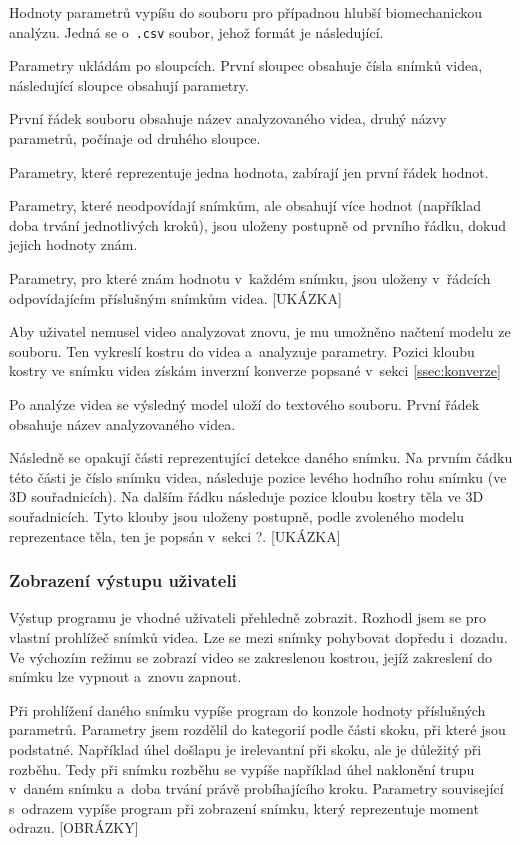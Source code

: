 Hodnoty parametrů vypíšu do souboru pro případnou hlubší biomechanickou analýzu. Jedná se o~\texttt{.csv} soubor, jehož formát je následující.

Parametry ukládám po sloupcích. První sloupec obsahuje čísla snímků videa, následující sloupce obsahují parametry.

První řádek souboru obsahuje název analyzovaného videa, druhý názvy parametrů, počínaje od druhého sloupce.

Parametry, které reprezentuje jedna hodnota, zabírají jen první řádek hodnot.

Parametry, které neodpovídají snímkům, ale obsahují více hodnot (například doba trvání jednotlivých kroků), jsou uloženy postupně od prvního řádku, dokud jejich hodnoty znám.

Parametry, pro které znám hodnotu v~každém snímku, jsou uloženy v~řádcích odpovídajícím příslušným snímkům videa.
[UKÁZKA]

Aby uživatel nemusel video analyzovat znovu, je mu umožněno načtení modelu ze souboru. Ten vykreslí kostru do videa a~analyzuje parametry. Pozici kloubu kostry ve snímku videa získám inverzní konverze popsané v~sekci \ref{ssec:konverze}

Po analýze videa se výsledný model uloží do textového souboru. První řádek obsahuje název analyzovaného videa.

Následně se opakují části reprezentující detekce daného snímku. Na prvním čádku této části je číslo snímku videa, následuje pozice levého hodního rohu snímku (ve 3D souřadnicích). Na dalším řádku následuje pozice kloubu kostry těla ve 3D souřadnicích. Tyto klouby jsou uloženy postupně, podle zvoleného modelu reprezentace těla, ten je popsán v~sekci ?. [UKÁZKA]

\subsubsection{Zobrazení výstupu uživateli}

Výstup programu je vhodné uživateli přehledně zobrazit. Rozhodl jsem se pro vlastní prohlížeč snímků videa. Lze se mezi snímky pohybovat dopředu i~dozadu. Ve výchozím režimu se zobrazí video se zakreslenou kostrou, jejíž zakreslení do snímku lze vypnout a~znovu zapnout.

Při prohlížení daného snímku vypíše program do konzole hodnoty příslušných parametrů. Parametry jsem rozdělil do kategorií podle části skoku, při které jsou podstatné. Například úhel došlapu je irelevantní při skoku, ale je důležitý při rozběhu. Tedy při snímku rozběhu se vypíše například úhel naklonění trupu v~daném snímku a~doba trvání právě probíhajícího kroku. Parametry související s~odrazem vypíše program při zobrazení snímku, který reprezentuje moment odrazu. [OBRÁZKY]

